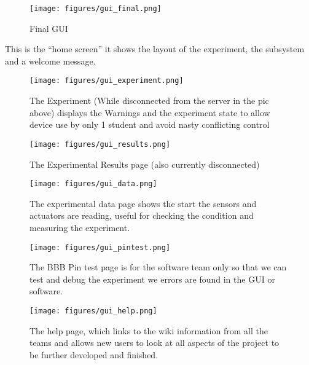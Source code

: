 \begin{figure}[H]
	\centering
	\texttt{[image: figures/gui\_final.png]}
	\caption{Final GUI} 
\end{figure}

This is the ``home screen'' it shows the layout of the experiment, the subsystem and a welcome message.

\begin{figure}[H]
	\centering
	\texttt{[image: figures/gui\_experiment.png]}
	\caption{The Experiment (While disconnected from the server in the pic above) displays the Warnings and the experiment state to allow device use by only 1 student and avoid nasty conflicting control} 
\end{figure}

\begin{figure}[H]
	\centering
	\texttt{[image: figures/gui\_results.png]}
	\caption{The Experimental Results page (also currently disconnected)} 
\end{figure}

\begin{figure}[H]
	\centering
	\texttt{[image: figures/gui\_data.png]}
	\caption{The experimental data page shows the start the sensors and actuators are reading, useful for checking the condition and measuring the experiment. } 
\end{figure}

\begin{figure}[H]
	\centering
	\texttt{[image: figures/gui\_pintest.png]}
	\caption{The BBB Pin test page is for the software team only so that we can test and debug the experiment we errors are found in the GUI or software. } 
\end{figure}

\begin{figure}[H]
	\centering
	\texttt{[image: figures/gui\_help.png]}
	\caption{The help page, which links to the wiki information from all the teams and allows new users to look at all aspects of the project to be further developed and finished. } 
\end{figure}




